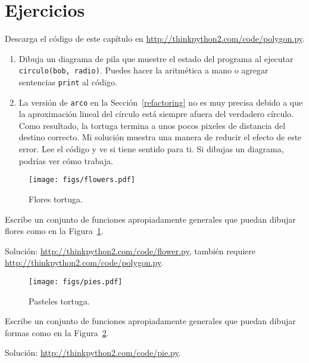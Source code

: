 \documentclass[10pt]{book}
\begin{document}
\section{Ejercicios}

\begin{exercise}

Descarga el código de este capítulo en
\url{http://thinkpython2.com/code/polygon.py}.

\begin{enumerate}

\item Dibuja un diagrama de pila que muestre el estado del programa
al ejecutar {\tt circulo(bob, radio)}.  Puedes hacer la
aritmética a mano o agregar sentencias {\tt print} al código.

\item La versión de {\tt arco} en la Sección~\ref{refactoring} no es
muy precisa debido a que la aproximación lineal del
círculo está siempre afuera del verdadero círculo.  Como resultado,
la tortuga termina a unos pocos pixeles de distancia del destino
correcto.  Mi solución muestra una manera de reducir
el efecto de este error.  Lee el código y ve si
tiene sentido para ti.  Si dibujas un diagrama, podrías ver cómo trabaja.

\end{enumerate}

\end{exercise}

\begin{figure}
\centerline
{\texttt{[image: figs/flowers.pdf]}}
\caption{Flores tortuga.}
\label{fig.flowers}
\end{figure}

\begin{exercise}

Escribe un conjunto de funciones apropiadamente generales que
puedan dibujar flores como en la Figura~\ref{fig.flowers}.

Solución: \url{http://thinkpython2.com/code/flower.py},
también requiere \url{http://thinkpython2.com/code/polygon.py}.

\end{exercise}

\begin{figure}
\centerline
{\texttt{[image: figs/pies.pdf]}}
\caption{Pasteles tortuga.}
\label{fig.pies}
\end{figure}


\begin{exercise}

Escribe un conjunto de funciones apropiadamente generales que
puedan dibujar formas como en la Figura~\ref{fig.pies}.

Solución: \url{http://thinkpython2.com/code/pie.py}.

\end{exercise}
\end{document}
